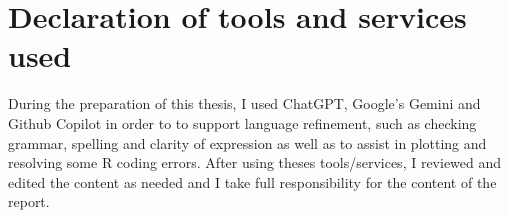 \clearpage

\section{Declaration of tools and services used} \label{sec:declaration_tools_services}

During the preparation of this thesis, I used ChatGPT, Google's Gemini and Github Copilot in order to to support language refinement, such as checking grammar, spelling and clarity of expression as well as to assist in plotting and resolving some R coding errors. After using theses tools/services, I reviewed and edited the content as needed and I take full responsibility for the content of the report.
